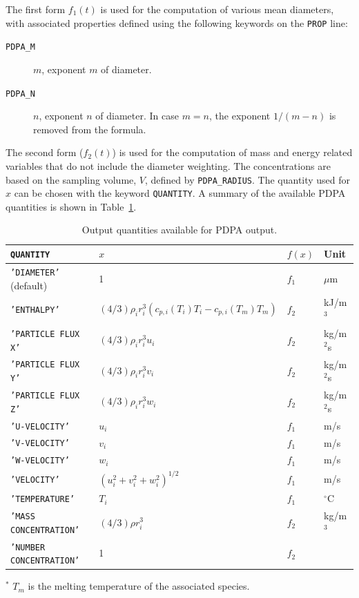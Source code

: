 \documentclass[11pt]{book}
\newcommand{\ct}{\tt\small}
\begin{document}
The first form $f_1(t)$ is used for the computation of various mean diameters, with
associated properties defined using the following keywords on the {\ct PROP} line:
\begin{description}
\item[{\ct PDPA\_M}] $m$, exponent $m$ of diameter.
\item[{\ct PDPA\_N}] $n$, exponent $n$ of diameter. In case $m=n$, the exponent $1/(m-n)$ is removed from the formula.
\end{description}
\noindent The second form ($f_2(t)$) is used for the computation of mass and energy related variables that do not include the diameter weighting.
The concentrations are based on the sampling volume, $V$, defined by {\ct PDPA\_RADIUS}.
The quantity used for $x$ can be chosen with the keyword {\ct QUANTITY}.
A summary of the available PDPA quantities is shown in Table~\ref{tbl:pdpa}.

\begin{table}[!ht]
\caption{Output quantities available for PDPA output.}
\label{tbl:pdpa}
\begin{center}
\begin{tabular}{|l|l|l|l|}
\hline
{\ct QUANTITY}          & $x$                           & $f(x)$ & Unit \\ \hline
{\ct 'DIAMETER'} (default) & 1                          & $f_1$  & $\mu$m \\
{\ct 'ENTHALPY'}        & $(4/3)\rho_i r_i^3 \left(c_{p,i}(T_i)T_i-c_{p,i}(T_m)T_m \right)$     & $f_2$  & kJ/m$^3$ \\
{\ct 'PARTICLE FLUX X'}  & $(4/3)\rho_i r_i^3 u_i$       & $f_2$  & kg/m$^2$s \\
{\ct 'PARTICLE FLUX Y'}  & $(4/3)\rho_i r_i^3 v_i$       & $f_2$  & kg/m$^2$s \\
{\ct 'PARTICLE FLUX Z'}  & $(4/3)\rho_i r_i^3 w_i$       & $f_2$  & kg/m$^2$s \\
{\ct 'U-VELOCITY'}      & $u_i$                         & $f_1$  & m/s \\
{\ct 'V-VELOCITY'}      & $v_i$                         & $f_1$  & m/s \\
{\ct 'W-VELOCITY'}      & $w_i$                         & $f_1$  & m/s \\
{\ct 'VELOCITY'}        & $(u_i^2+v_i^2+w_i^2)^{1/2}$   & $f_1$  & m/s \\
{\ct 'TEMPERATURE'}     & $T_i$                         & $f_1$  & ${}^\circ$C \\
{\ct 'MASS CONCENTRATION'} & $(4/3)\rho r_i^3 $         & $f_2$  & kg/m$^3$ \\
{\ct 'NUMBER CONCENTRATION'} & 1                        & $f_2$  & \\
 \hline
\end{tabular}
\end{center}
${}^*$ $T_m$ is the melting temperature of the associated species.
\end{table}
\end{document}
